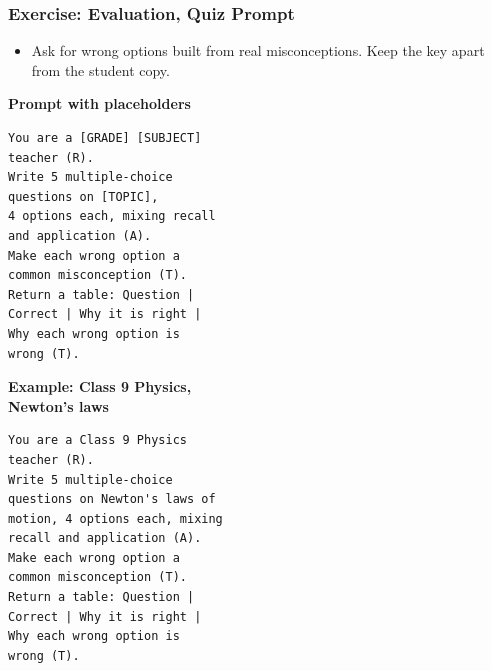\begin{frame}[fragile]\frametitle{Exercise: Evaluation, Quiz Prompt}
\begin{itemize}
\item Ask for wrong options built from real misconceptions. Keep the key apart from the student copy.
\end{itemize}
\PairBegin
{\footnotesize\textbf{Prompt with placeholders}\\\mbox{}}
\begin{lstlisting}[language={},numbers=none]
You are a [GRADE] [SUBJECT]
teacher (R).
Write 5 multiple-choice
questions on [TOPIC],
4 options each, mixing recall
and application (A).
Make each wrong option a
common misconception (T).
Return a table: Question |
Correct | Why it is right |
Why each wrong option is
wrong (T).
\end{lstlisting}
\PairMid
{\footnotesize\textbf{Example: Class 9 Physics,\\ Newton's laws}}
\begin{lstlisting}[language={},numbers=none]
You are a Class 9 Physics
teacher (R).
Write 5 multiple-choice
questions on Newton's laws of
motion, 4 options each, mixing
recall and application (A).
Make each wrong option a
common misconception (T).
Return a table: Question |
Correct | Why it is right |
Why each wrong option is
wrong (T).
\end{lstlisting}
\PairEnd
\end{frame}

